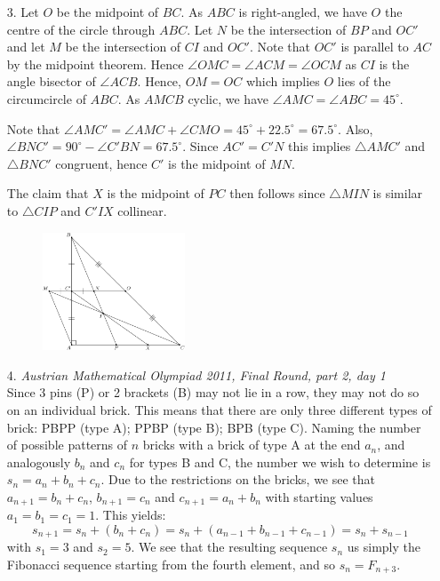 \documentclass[a4paper, 12pt]{article}
\begin{document}
\begin{enumerate}
    
    \item[3.] Let $O$ be the midpoint of $BC$. As $ABC$ is right-angled, we have $O$ the centre of the circle through $ABC$. Let $N$ be the intersection of $BP$ and $OC'$ and let $M$ be the intersection of $CI$ and $OC'$. Note that $OC'$ is parallel to $AC$ by the midpoint theorem. Hence $\angle OMC = \angle ACM = \angle OCM$ as $CI$ is the angle bisector of $\angle ACB$. Hence, $OM = OC$ which implies $O$ lies of the circumcircle of $ABC$. As $AMCB$ cyclic, we have $\angle AMC = \angle ABC = 45^\circ$.
    
    Note that $\angle AMC' = \angle AMC + \angle CMO = 45^\circ + 22.5^\circ = 67.5^\circ$. Also, $\angle BNC' = 90^\circ - \angle C'BN = 67.5^\circ$. Since $AC' = C'N$ this implies $\triangle AMC'$ and $\triangle BNC'$ congruent, hence $C'$ is the midpoint of $MN$.
    
    The claim that $X$ is the midpoint of $PC$ then follows since $\triangle MIN$ is similar to $\triangle CIP$ and $C'IX$ collinear.
        
    \begin{figure}[h!]
        \centering
        \includegraphics[width=0.4\textwidth]{seniortest5_q3.pdf}
    \end{figure}
    

    \item[4.] \textit{Austrian Mathematical Olympiad 2011, Final Round, part 2, day 1} \\ Since 3 pins (P) or 2 brackets (B) may not lie in a row, they may not do so on an individual brick. This means that there are only three different types of brick: PBPP (type A); PPBP (type B); BPB (type C). Naming the number of possible patterns of $n$ bricks with a brick of type A at the end $a_n$, and analogously $b_n$ and $c_n$ for types B and C, the number we wish to determine is $s_n=a_n+b_n+c_n$. Due to the restrictions on the bricks, we see that $a_{n+1}=b_n+c_n$, $b_{n+1}=c_n$ and $c_{n+1}=a_n+b_n$ with starting values $a_1=b_1=c_1=1$. This yields:
\begin{equation*}
s_{n+1}=s_n+(b_n+c_n)=s_n+(a_{n-1}+b_{n-1}+c_{n-1})=s_n+s_{n-1}
\end{equation*}
with $s_1=3$ and $s_2=5$. We see that the resulting sequence $s_n$ us simply the Fibonacci sequence starting from the fourth element, and so $s_n=F_{n+3}$.
    

\end{enumerate}
\end{document}
